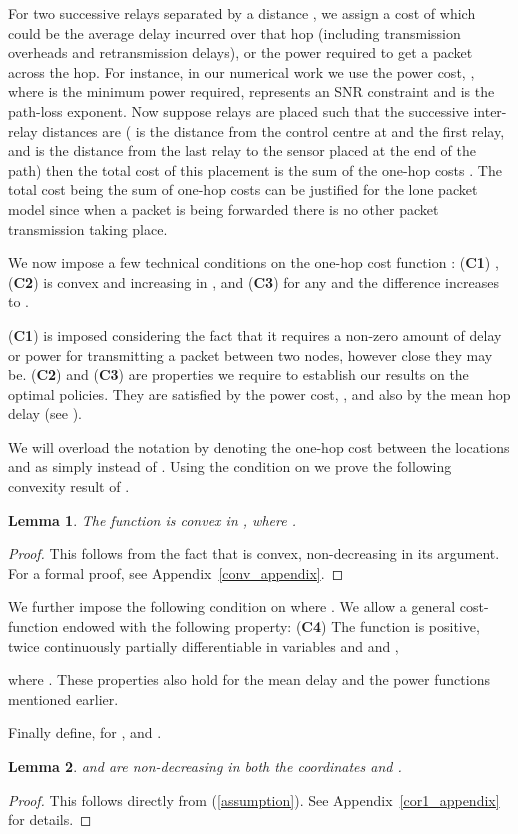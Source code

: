 \documentclass[conference]{IEEEtran}
\newtheorem{lemma}{Lemma}
\begin{document}
For two successive relays separated by a distance , we assign a cost of  
which could be the average delay incurred over that hop (including transmission overheads and 
retransmission delays), or the power required to get a packet across the hop.
For instance, in our numerical work we use the power cost, 
, where  is the minimum power required,  
represents an SNR constraint and  is the path-loss exponent. Now suppose 
 relays are placed such that the successive 
inter-relay distances are  ( is the distance from the 
control centre at  and the first relay, and  is the distance from 
the last relay to the sensor placed at the end of the path) then the total cost 
of this placement is the sum of the one-hop costs .
The total cost being the sum of one-hop costs can be justified for the lone packet 
model since when a packet is being forwarded there is no other packet
transmission taking place. 

We now impose a few technical conditions on the one-hop cost function
: (\textbf{C1}) , (\textbf{C2})  is convex and
increasing in , and (\textbf{C3}) for any  and  the
difference  increases to .

(\textbf{C1}) is imposed considering the fact that it requires a
non-zero amount of delay or power for transmitting a packet between
two nodes, however close they may be. (\textbf{C2}) and (\textbf{C3})
are properties we require to establish our results on the optimal
policies. They are satisfied by the power cost,  ,
and also by the mean hop delay (see \cite{Prasenjit}).

We will overload the notation  by denoting the one-hop cost between 
the locations  and  as simply  instead 
of . Using the condition on  we prove the following 
convexity result of .
\begin{lemma} \label{conv} The function  is convex in ,
  where .
\end{lemma}
\begin{proof}
  This follows from the fact that  is convex, non-decreasing
  in its argument. For a formal proof, see
  Appendix~\ref{conv_appendix}.
\end{proof}
We further impose the following condition on  where
.  We allow a general cost-function  endowed
with the following property: (\textbf{C4}) The function  is
positive, twice continuously partially differentiable in variables 
and  and ,

where . These properties also hold for the mean delay and the power
functions mentioned earlier.

Finally define, for ,  and 
. 
\begin{lemma}
\label{cor1}
 and  are 
non-decreasing in both the coordinates  and . 
\end{lemma}
\begin{proof}
  This follows directly from (\ref{assumption}). See
  Appendix~\ref{cor1_appendix} for details.
\end{proof}
\end{document}
